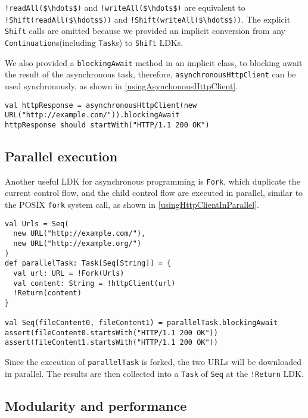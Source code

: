 \lstinline[mathescape=true]{!readAll($\hdots$)} and \lstinline[mathescape=true]{!writeAll($\hdots$)} are equivalent to \lstinline[mathescape=true]{!Shift(readAll($\hdots$))} and \lstinline[mathescape=true]{!Shift(writeAll($\hdots$))}. The explicit \lstinline{Shift} calls are omitted because we provided an implicit conversion from any \lstinline{Continuation}s(including \lstinline{Task}s) to \lstinline{Shift} LDKs.

We also provided a \lstinline{blockingAwait} method in an implicit class, to blocking await the result of the asynchronous task, therefore, \lstinline{asynchronousHttpClient} can be used synchronously, as shown in \cref{usingAsynchonousHttpClient}.

\begin{lstlisting}[caption={Using the example HTTP client},label={usingAsynchonousHttpClient}]
val httpResponse = asynchronousHttpClient(new URL("http://example.com/")).blockingAwait
httpResponse should startWith("HTTP/1.1 200 OK")
\end{lstlisting}

\subsection{Parallel execution}\label{Parallel execution}

Another useful LDK for asynchronous programming is \lstinline{Fork}, which duplicate the current control flow, and the child control flow are executed in parallel, similar to the POSIX \lstinline{fork} system call, as shown in \cref{usingHttpClientInParallel}.

\begin{lstlisting}[caption={Using HTTP client in parallel},label={usingHttpClientInParallel}]
val Urls = Seq(
  new URL("http://example.com/"),
  new URL("http://example.org/")
)
def parallelTask: Task[Seq[String]] = {
  val url: URL = !Fork(Urls)
  val content: String = !httpClient(url)
  !Return(content)
}

val Seq(fileContent0, fileContent1) = parallelTask.blockingAwait
assert(fileContent0.startsWith("HTTP/1.1 200 OK"))
assert(fileContent1.startsWith("HTTP/1.1 200 OK"))
\end{lstlisting}

Since the execution of \lstinline{parallelTask} is forked, the two URLs will be downloaded in parallel. The results are then collected into a \lstinline{Task} of \lstinline{Seq} at the \lstinline{!Return} LDK.

\subsection{Modularity and performance}

